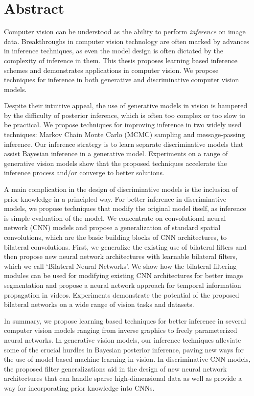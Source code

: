 \chapter{Abstract}
\label{chap:abstract}

Computer vision can be understood as the ability to perform \emph{inference} on
image data. Breakthroughs in computer vision technology are often marked by advances
in inference techniques, as even the model design is often dictated by the
complexity of inference in them. This thesis proposes learning based inference schemes
and demonstrates applications in computer vision. We propose techniques for inference
in both generative and discriminative computer vision models.

Despite their intuitive appeal, the use of generative models in vision is hampered
by the difficulty of posterior inference, which is often too complex or too slow to
be practical. We propose techniques for improving inference in two widely used
techniques: Markov Chain Monte Carlo (MCMC) sampling and message-passing inference.
Our inference strategy is to learn separate discriminative models that assist Bayesian
inference in a generative model. Experiments on a range of generative vision models show
that the proposed techniques accelerate the inference process and/or converge to better solutions.

A main complication in the design of discriminative models is the inclusion of prior
knowledge in a principled way. For better inference in discriminative models, we propose
techniques that modify the original model itself, as inference is simple evaluation of
the model. We concentrate on convolutional neural network (CNN) models and propose a
generalization of standard spatial convolutions, which are the basic building blocks of CNN
architectures, to bilateral convolutions. First, we generalize the existing use of
bilateral filters and then propose new neural network architectures with learnable
bilateral filters, which we call `Bilateral Neural Networks'. We show how the bilateral
filtering modules can be used for modifying existing CNN architectures for better image
segmentation and propose a neural network approach for temporal information propagation
in videos. Experiments demonstrate the potential of the proposed bilateral networks on
a wide range of vision tasks and datasets.

In summary, we propose learning based techniques for better inference in several
computer vision models ranging from inverse graphics to freely
parameterized neural networks. In generative vision models, our inference techniques
alleviate some of the crucial hurdles in Bayesian posterior inference, paving new ways
for the use of model based machine learning in vision. In discriminative CNN models,
the proposed filter generalizations aid in the design of new neural network architectures
that can handle sparse high-dimensional data as well as provide a way for incorporating
prior knowledge into CNNs.
